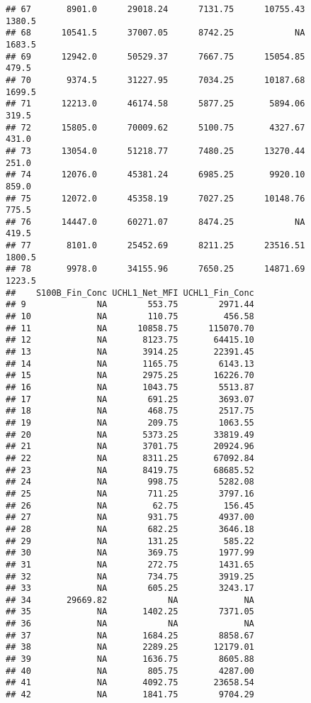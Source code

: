 \documentclass[]{article}
\begin{document}
\begin{verbatim}
## 67       8901.0      29018.24      7131.75      10755.43        1380.5
## 68      10541.5      37007.05      8742.25            NA        1683.5
## 69      12942.0      50529.37      7667.75      15054.85         479.5
## 70       9374.5      31227.95      7034.25      10187.68        1699.5
## 71      12213.0      46174.58      5877.25       5894.06         319.5
## 72      15805.0      70009.62      5100.75       4327.67         431.0
## 73      13054.0      51218.77      7480.25      13270.44         251.0
## 74      12076.0      45381.24      6985.25       9920.10         859.0
## 75      12072.0      45358.19      7027.25      10148.76         775.5
## 76      14447.0      60271.07      8474.25            NA         419.5
## 77       8101.0      25452.69      8211.25      23516.51        1800.5
## 78       9978.0      34155.96      7650.25      14871.69        1223.5
##    S100B_Fin_Conc UCHL1_Net_MFI UCHL1_Fin_Conc
## 9              NA        553.75        2971.44
## 10             NA        110.75         456.58
## 11             NA      10858.75      115070.70
## 12             NA       8123.75       64415.10
## 13             NA       3914.25       22391.45
## 14             NA       1165.75        6143.13
## 15             NA       2975.25       16226.70
## 16             NA       1043.75        5513.87
## 17             NA        691.25        3693.07
## 18             NA        468.75        2517.75
## 19             NA        209.75        1063.55
## 20             NA       5373.25       33819.49
## 21             NA       3701.75       20924.96
## 22             NA       8311.25       67092.84
## 23             NA       8419.75       68685.52
## 24             NA        998.75        5282.08
## 25             NA        711.25        3797.16
## 26             NA         62.75         156.45
## 27             NA        931.75        4937.00
## 28             NA        682.25        3646.18
## 29             NA        131.25         585.22
## 30             NA        369.75        1977.99
## 31             NA        272.75        1431.65
## 32             NA        734.75        3919.25
## 33             NA        605.25        3243.17
## 34       29669.82            NA             NA
## 35             NA       1402.25        7371.05
## 36             NA            NA             NA
## 37             NA       1684.25        8858.67
## 38             NA       2289.25       12179.01
## 39             NA       1636.75        8605.88
## 40             NA        805.75        4287.00
## 41             NA       4092.75       23658.54
## 42             NA       1841.75        9704.29

\end{verbatim}
\end{document}
